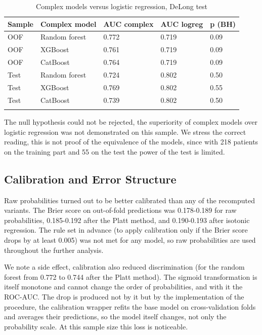 \documentclass[pdflatex,sn-basic,Numbered]{sn-jnl}
\begin{document}
\begin{table}[h]
\caption{Complex models versus logistic regression, DeLong test}\label{tab4}%
\begin{tabular}{@{}lllll@{}}
\toprule
Sample & Complex model & AUC complex & AUC logreg & p (BH)\\
\midrule
OOF & Random forest & 0.772 & 0.719 & 0.09\\
OOF & XGBoost & 0.761 & 0.719 & 0.09\\
OOF & CatBoost & 0.764 & 0.719 & 0.09\\
Test & Random forest & 0.724 & 0.802 & 0.50\\
Test & XGBoost & 0.769 & 0.802 & 0.55\\
Test & CatBoost & 0.739 & 0.802 & 0.50\\
\botrule
\end{tabular}
\end{table}

The null hypothesis could not be rejected, the superiority of complex models over logistic regression was not demonstrated on this sample. We stress the correct reading, this is not proof of the equivalence of the models, since with 218 patients on the training part and 55 on the test the power of the test is limited.

\subsection{Calibration and Error Structure}\label{subsec3_5}

Raw probabilities turned out to be better calibrated than any of the recomputed variants. The Brier score on out-of-fold predictions was 0.178-0.189 for raw probabilities, 0.185-0.192 after the Platt method, and 0.190-0.193 after isotonic regression. The rule set in advance (to apply calibration only if the Brier score drops by at least 0.005) was not met for any model, so raw probabilities are used throughout the further analysis.

We note a side effect, calibration also reduced discrimination (for the random forest from 0.772 to 0.744 after the Platt method). The sigmoid transformation is itself monotone and cannot change the order of probabilities, and with it the ROC-AUC. The drop is produced not by it but by the implementation of the procedure, the calibration wrapper refits the base model on cross-validation folds and averages their predictions, so the model itself changes, not only the probability scale. At this sample size this loss is noticeable.
\end{document}
